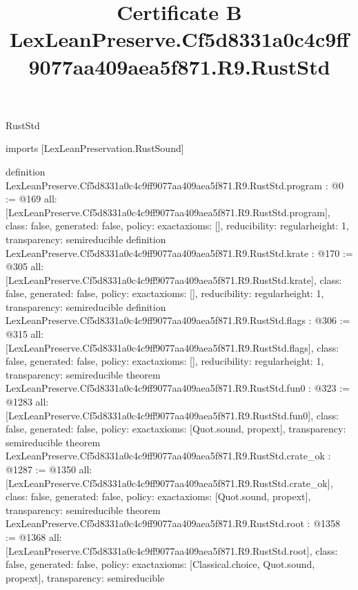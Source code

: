 \begin{lexlean}{RustStd}
\title{Certificate B LexLeanPreserve.Cf5d8331a0c4c9ff9077aa409aea5f871.R9.RustStd}
\begin{coremodule}
imports [LexLeanPreservation.RustSound]

definition LexLeanPreserve.Cf5d8331a0c4c9ff9077aa409aea5f871.R9.RustStd.program : @0 := @169 {
  all: [LexLeanPreserve.Cf5d8331a0c4c9ff9077aa409aea5f871.R9.RustStd.program],
  class: false,
  generated: false,
  policy: exact{axioms: []},
  reducibility: regular{height: 1},
  transparency: semireducible
}
definition LexLeanPreserve.Cf5d8331a0c4c9ff9077aa409aea5f871.R9.RustStd.krate : @170 := @305 {
  all: [LexLeanPreserve.Cf5d8331a0c4c9ff9077aa409aea5f871.R9.RustStd.krate],
  class: false,
  generated: false,
  policy: exact{axioms: []},
  reducibility: regular{height: 1},
  transparency: semireducible
}
definition LexLeanPreserve.Cf5d8331a0c4c9ff9077aa409aea5f871.R9.RustStd.flags : @306 := @315 {
  all: [LexLeanPreserve.Cf5d8331a0c4c9ff9077aa409aea5f871.R9.RustStd.flags],
  class: false,
  generated: false,
  policy: exact{axioms: []},
  reducibility: regular{height: 1},
  transparency: semireducible
}
theorem LexLeanPreserve.Cf5d8331a0c4c9ff9077aa409aea5f871.R9.RustStd.fun0 : @323 := @1283 {
  all: [LexLeanPreserve.Cf5d8331a0c4c9ff9077aa409aea5f871.R9.RustStd.fun0],
  class: false,
  generated: false,
  policy: exact{axioms: [Quot.sound, propext]},
  transparency: semireducible
}
theorem LexLeanPreserve.Cf5d8331a0c4c9ff9077aa409aea5f871.R9.RustStd.crate_ok : @1287 := @1350 {
  all: [LexLeanPreserve.Cf5d8331a0c4c9ff9077aa409aea5f871.R9.RustStd.crate_ok],
  class: false,
  generated: false,
  policy: exact{axioms: [Quot.sound, propext]},
  transparency: semireducible
}
theorem LexLeanPreserve.Cf5d8331a0c4c9ff9077aa409aea5f871.R9.RustStd.root : @1358 := @1368 {
  all: [LexLeanPreserve.Cf5d8331a0c4c9ff9077aa409aea5f871.R9.RustStd.root],
  class: false,
  generated: false,
  policy: exact{axioms: [Classical.choice, Quot.sound, propext]},
  transparency: semireducible
}


\end{coremodule}
\end{lexlean}
